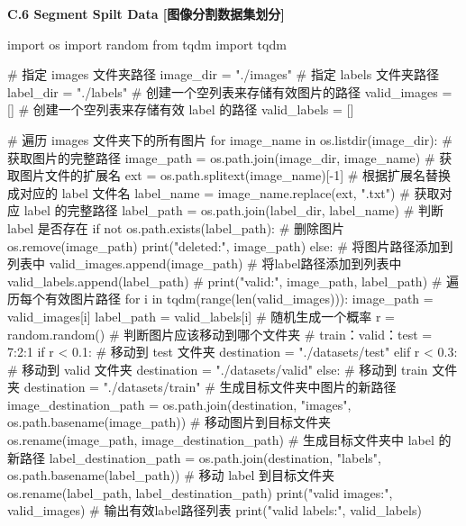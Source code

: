 \documentclass{MathorCupmodeling}
\begin{document}
\textbf{C.6 Segment Spilt Data [图像分割数据集划分]}
\begin{python}
import os
import random
from tqdm import tqdm

# 指定 images 文件夹路径
image_dir = "./images"
# 指定 labels 文件夹路径
label_dir = "./labels"
# 创建一个空列表来存储有效图片的路径
valid_images = []
# 创建一个空列表来存储有效 label 的路径
valid_labels = []

# 遍历 images 文件夹下的所有图片
for image_name in os.listdir(image_dir):
    # 获取图片的完整路径
    image_path = os.path.join(image_dir, image_name)
    # 获取图片文件的扩展名
    ext = os.path.splitext(image_name)[-1]
    # 根据扩展名替换成对应的 label 文件名
    label_name = image_name.replace(ext, ".txt")
    # 获取对应 label 的完整路径
    label_path = os.path.join(label_dir, label_name)
    # 判断 label 是否存在
    if not os.path.exists(label_path):
        # 删除图片
        os.remove(image_path)
        print("deleted:", image_path)
    else:
        # 将图片路径添加到列表中
        valid_images.append(image_path)
        # 将label路径添加到列表中
        valid_labels.append(label_path)
        # print("valid:", image_path, label_path)
# 遍历每个有效图片路径
for i in tqdm(range(len(valid_images))):
    image_path = valid_images[i]
    label_path = valid_labels[i]
    # 随机生成一个概率
    r = random.random()
    # 判断图片应该移动到哪个文件夹
    # train：valid：test = 7:2:1
    if r < 0.1:
        # 移动到 test 文件夹
        destination = "./datasets/test"
    elif r < 0.3:
        # 移动到 valid 文件夹
        destination = "./datasets/valid"
    else:
        # 移动到 train 文件夹
        destination = "./datasets/train"
    # 生成目标文件夹中图片的新路径
    image_destination_path = os.path.join(destination, "images", os.path.basename(image_path))
    # 移动图片到目标文件夹
    os.rename(image_path, image_destination_path)
    # 生成目标文件夹中 label 的新路径
    label_destination_path = os.path.join(destination, "labels", os.path.basename(label_path))
    # 移动 label 到目标文件夹
    os.rename(label_path, label_destination_path)
print("valid images:", valid_images)
# 输出有效label路径列表
print("valid labels:", valid_labels)
\end{python}
\end{document}

